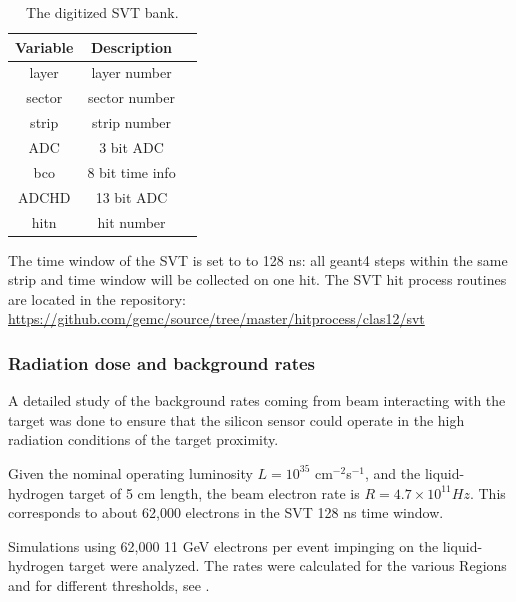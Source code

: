 \begin{table}[h]
	\begin{center}
		\begin{tabular}{| c | c | c |}
			\hline \hline
			Variable  & Description   \\
			\hline
               layer  &        layer number    \\
              sector  &       sector number    \\
               strip  &        strip number    \\
                 ADC  &           3 bit ADC    \\
                 bco  &     8 bit time info    \\
               ADCHD  &          13 bit ADC    \\
                hitn  &          hit number    \\
			\hline \hline
		\end{tabular}
	\end{center}
	\caption{The digitized SVT bank.}\label{tab:bstBank}
\end{table}

\noindent The time window  of the SVT is set to to 128 ns: all geant4 steps within the same strip and time window will be collected on one hit.
The SVT hit process routines are located in the repository: \url{https://github.com/gemc/source/tree/master/hitprocess/clas12/svt}

\subsubsection{Radiation dose and background rates}
A detailed study of the background rates coming from beam interacting with the target was done to ensure that the silicon sensor
could operate in the high radiation conditions of the target proximity.

Given the nominal operating luminosity $L=10^{35}$ cm$^{-2}$s$^{-1}$, and the liquid-hydrogen target of 5 cm length, the beam electron rate
is $R=4.7 \times 10^{11} Hz$. This corresponds to about 62,000 electrons in the SVT 128 ns time window.

Simulations using 62,000 11 GeV electrons per event impinging on the liquid-hydrogen target were analyzed.
The rates were calculated for the various Regions and for different thresholds, see .


